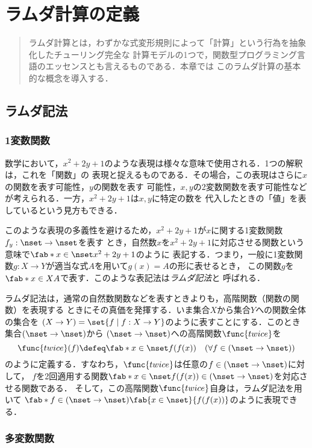 \documentclass[uplatex,dvipdfmx,report,fleqn]{jsbook}
\begin{document}
\chapter{ラムダ計算の定義}

\begin{abstract}
ラムダ計算とは，わずかな式変形規則によって「計算」という行為を抽象化したチューリング完全な
計算モデルの1つで，関数型プログラミング言語のエッセンスとも言えるものである．本章では
このラムダ計算の基本的な概念を導入する．
\end{abstract}

\section{ラムダ記法}

\subsection{1変数関数}

数学において，$x^2+2y+1$のような表現は様々な意味で使用される．1つの解釈は，これを「関数」の
表現と捉えるものである．その場合，この表現はさらに$x$の関数を表す可能性，$y$の関数を表す
可能性，$x,y$の2変数関数を表す可能性などが考えられる．一方，$x^2+2y+1$は$x,y$に特定の数を
代入したときの「値」を表しているという見方もできる．

このような表現の多義性を避けるため，$x^2+2y+1$が$x$に関する1変数関数$f_y:\nset\to\nset$を表す
とき，自然数$x$を$x^2+2y+1$に対応させる関数という意味で$\fab*{x\in\nset}{x^2+2y+1}$のように
表記する．つまり，一般に1変数関数$g:X\to Y$が適当な式$A$を用いて$g(x)=A$の形に表せるとき，
この関数$g$を$\fab*{x\in X}{A}$で表す．このような表記法は\emph{ラムダ記法}と
呼ばれる．

ラムダ記法は，通常の自然数関数などを表すときよりも，高階関数（関数の関数）を表現する
ときにその真価を発揮する．いま集合$X$から集合$Y$への関数全体の集合を
$(X\to Y)=\set{f\mid f:X\to Y}$のように表すことにする．このとき集合$(\nset\to\nset)$から
$(\nset\to\nset)$への高階関数$\func{twice}$を
\[
\func{twice}(f) \defeq \fab*{x\in\nset}{f(f(x))} \quad (\forall f\in(\nset\to\nset))
\]
のように定義する．すなわち，$\func{twice}$は任意の$f\in(\nset\to\nset)$に対して，
$f$を2回適用する関数$\fab*{x\in\nset}{f(f(x))}\in(\nset\to\nset)$を対応させる関数である．
そして，この高階関数$\func{twice}$自身は，ラムダ記法を用いて
$\fab*{f\in(\nset\to\nset)}{\fab{x\in\nset}{f(f(x))}}$のように表現できる．

\subsection{多変数関数}
\end{document}
